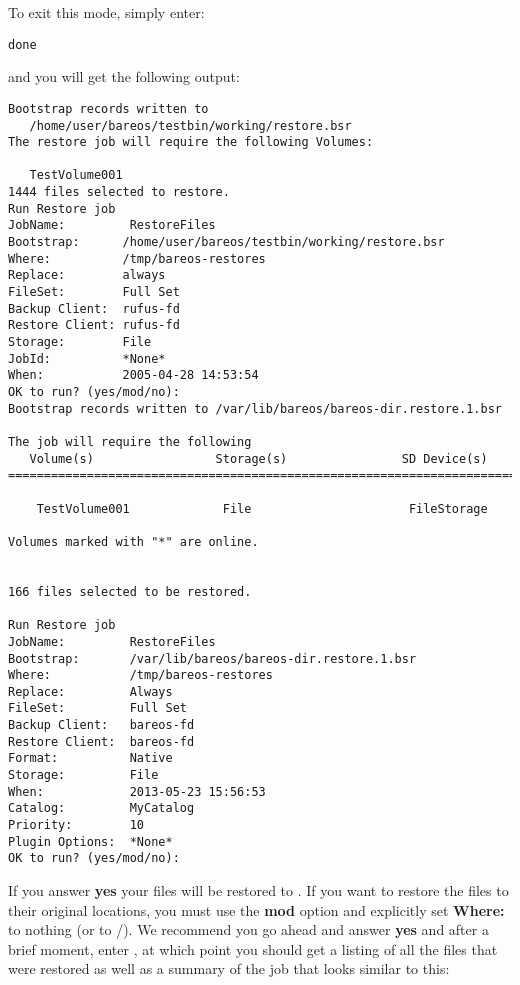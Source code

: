 To exit this mode, simply enter:

\footnotesize
\begin{verbatim}
done
\end{verbatim}
\normalsize

and you will get the following output:

\footnotesize
\begin{verbatim}
Bootstrap records written to
   /home/user/bareos/testbin/working/restore.bsr
The restore job will require the following Volumes:

   TestVolume001
1444 files selected to restore.
Run Restore job
JobName:         RestoreFiles
Bootstrap:      /home/user/bareos/testbin/working/restore.bsr
Where:          /tmp/bareos-restores
Replace:        always
FileSet:        Full Set
Backup Client:  rufus-fd
Restore Client: rufus-fd
Storage:        File
JobId:          *None*
When:           2005-04-28 14:53:54
OK to run? (yes/mod/no):
Bootstrap records written to /var/lib/bareos/bareos-dir.restore.1.bsr

The job will require the following
   Volume(s)                 Storage(s)                SD Device(s)
===========================================================================
   
    TestVolume001             File                      FileStorage

Volumes marked with "*" are online.


166 files selected to be restored.

Run Restore job
JobName:         RestoreFiles
Bootstrap:       /var/lib/bareos/bareos-dir.restore.1.bsr
Where:           /tmp/bareos-restores
Replace:         Always
FileSet:         Full Set
Backup Client:   bareos-fd
Restore Client:  bareos-fd
Format:          Native
Storage:         File
When:            2013-05-23 15:56:53
Catalog:         MyCatalog
Priority:        10
Plugin Options:  *None*
OK to run? (yes/mod/no): 
\end{verbatim}
\normalsize

If you answer {\bf yes} your files will be restored to
. If you want to restore the files to their original
locations, you must use the {\bf mod} option and explicitly set {\bf Where:}
to nothing (or to /). We recommend you go ahead and answer {\bf yes} and after
a brief moment, enter , at which point you should get a listing
of all the files that were restored as well as a summary of the job that looks
similar to this:

